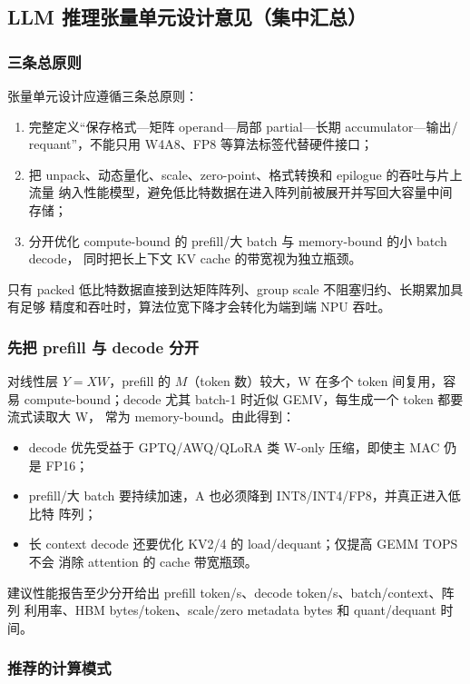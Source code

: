 \subsection{LLM 推理张量单元设计意见（集中汇总）}
\label{subsec:tensor-unit-design-opinions}

\subsubsection{三条总原则}

张量单元设计应遵循三条总原则：
\begin{enumerate}
  \item 完整定义“保存格式---矩阵 operand---局部 partial---长期 accumulator---输出/
  requant”，不能只用 W4A8、FP8 等算法标签代替硬件接口；
  \item 把 unpack、动态量化、scale、zero-point、格式转换和 epilogue 的吞吐与片上流量
  纳入性能模型，避免低比特数据在进入阵列前被展开并写回大容量中间存储；
  \item 分开优化 compute-bound 的 prefill/大 batch 与 memory-bound 的小 batch decode，
  同时把长上下文 KV cache 的带宽视为独立瓶颈。
\end{enumerate}
只有 packed 低比特数据直接到达矩阵阵列、group scale 不阻塞归约、长期累加具有足够
精度和吞吐时，算法位宽下降才会转化为端到端 NPU 吞吐。

\subsubsection{先把 prefill 与 decode 分开}

对线性层 $Y=XW$，prefill 的 $M$（token 数）较大，W 在多个 token 间复用，容易
compute-bound；decode 尤其 batch-1 时近似 GEMV，每生成一个 token 都要流式读取大 W，
常为 memory-bound。由此得到：
\begin{itemize}
  \item decode 优先受益于 GPTQ/AWQ/QLoRA 类 W-only 压缩，即使主 MAC 仍是 FP16；
  \item prefill/大 batch 要持续加速，A 也必须降到 INT8/INT4/FP8，并真正进入低比特
  阵列；
  \item 长 context decode 还要优化 KV2/4 的 load/dequant；仅提高 GEMM TOPS 不会
  消除 attention 的 cache 带宽瓶颈。
\end{itemize}

建议性能报告至少分开给出 prefill token/s、decode token/s、batch/context、阵列
利用率、HBM bytes/token、scale/zero metadata bytes 和 quant/dequant 时间。

\subsubsection{推荐的计算模式}

